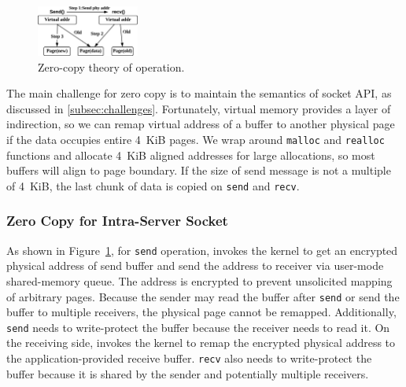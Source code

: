 \begin{figure}[t]
	\centering
	\includegraphics[width=0.3\textwidth]{images/zerocopy}
	\caption{Zero-copy theory of operation.}
	\label{fig:zerocopy}
\end{figure}

The main challenge for zero copy is to maintain the semantics of socket API, as discussed in \ref{subsec:challenges}.
Fortunately, virtual memory provides a layer of indirection, so we can remap virtual address of a buffer to another physical page if the data occupies entire 4~KiB pages.
We wrap around \texttt{malloc} and \texttt{realloc} functions and allocate 4~KiB aligned addresses for large allocations, so most buffers will align to page boundary.
If the size of send message is not a multiple of 4~KiB, the last chunk of data is copied on \texttt{send} and \texttt{recv}.

\subsubsection{Zero Copy for Intra-Server Socket}
\label{subsec:zero-copy-intra}

As shown in Figure~\ref{fig:zerocopy}, for \texttt{send} operation, \libipc{} invokes the kernel to get an encrypted physical address of send buffer and send the address to receiver via user-mode shared-memory queue.
The address is encrypted to prevent unsolicited mapping of arbitrary pages.
Because the sender may read the buffer after \texttt{send} or send the buffer to multiple receivers, the physical page cannot be remapped.
Additionally, \texttt{send} needs to write-protect the buffer because the receiver needs to read it.
On the receiving side, \libipc{} invokes the kernel to remap the encrypted physical address to the application-provided receive buffer.
\texttt{recv} also needs to write-protect the buffer because it is shared by the sender and potentially multiple receivers.

